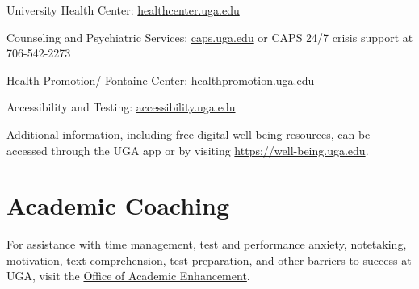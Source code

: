 \documentclass[12pt]{article}
\begin{document}
University Health Center: \url{healthcenter.uga.edu}

Counseling and Psychiatric Services: \url{caps.uga.edu} or CAPS 24/7
crisis support at 706-542-2273 

Health Promotion/ Fontaine Center: \url{healthpromotion.uga.edu}

Accessibility and Testing: \url{accessibility.uga.edu}

Additional information, including free digital well-being resources,
can be accessed through the UGA app or by visiting
\url{https://well-being.uga.edu}. 




\section*{\normalsize Academic Coaching}
\vspace{-4mm}

For assistance with time management, test and performance anxiety,
notetaking, motivation, text comprehension, test preparation, and
other barriers to success at UGA, visit the
\href{https://dae.uga.edu/services/academic-coaching/}{Office of Academic Enhancement}. 
\end{document}
